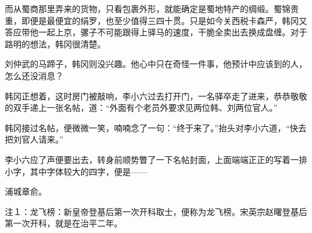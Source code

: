 而从蜀商那里弄来的货物，只看包裹外形，就能确定是蜀地特产的绸缎。蜀锦贵重，即便是最便宜的绢罗，也至少值得三四十贯。只是如今关西税卡森严，韩冈又答应带他一起上京，骡子不可能跟得上驿马的速度，干脆全卖出去换成盘缠。对于路明的想法，韩冈很清楚。

刘仲武的马蹄子，韩冈则没兴趣。他心中只在奇怪一件事，他预计中应该到的人，怎么还没消息？

韩冈正想着，这时房门被敲响，李小六过去打开门，一名驿卒走了进来，恭恭敬敬的双手递上一张名帖，道：“外面有个老员外要求见两位韩、刘两位官人。”

韩冈接过名帖，便微微一笑，喃喃念了一句：“终于来了。”抬头对李小六道，“快去把刘官人请来。”

李小六应了声便要出去，转身前顺势瞥了一下名帖封面，上面端端正正的写着一排小字，其中字体较大的四字，便是——

浦城章俞。

注１：龙飞榜：新皇帝登基后第一次开科取士，便称为龙飞榜。宋英宗赵曙登基后第一次开科，就是在治平二年。

